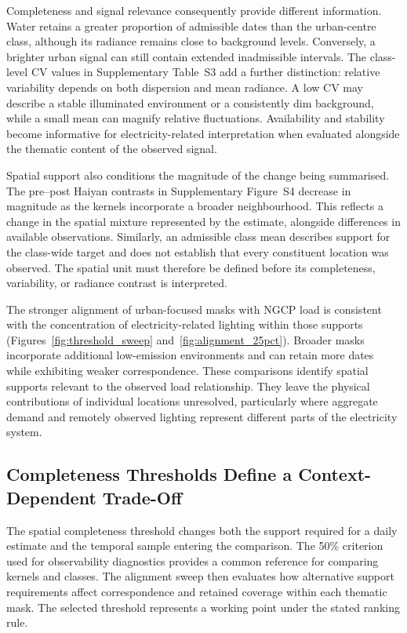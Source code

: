 \documentclass[]{interact}
\theoremstyle{plain}%
\theoremstyle{definition}
\theoremstyle{remark}
\begin{document}
        Completeness and signal relevance consequently provide different information. Water retains a greater proportion of admissible dates than the urban-centre class, although its radiance remains close to background levels. Conversely, a brighter urban signal can still contain extended inadmissible intervals. The class-level CV values in Supplementary Table~S3 add a further distinction: relative variability depends on both dispersion and mean radiance. A low CV may describe a stable illuminated environment or a consistently dim background, while a small mean can magnify relative fluctuations. Availability and stability become informative for electricity-related interpretation when evaluated alongside the thematic content of the observed signal.
        
        Spatial support also conditions the magnitude of the change being summarised. The pre--post Haiyan contrasts in Supplementary Figure~S4 decrease in magnitude as the kernels incorporate a broader neighbourhood. This reflects a change in the spatial mixture represented by the estimate, alongside differences in available observations. Similarly, an admissible class mean describes support for the class-wide target and does not establish that every constituent location was observed. The spatial unit must therefore be defined before its completeness, variability, or radiance contrast is interpreted.
        
        The stronger alignment of urban-focused masks with NGCP load is consistent with the concentration of electricity-related lighting within those supports (Figures~\ref{fig:threshold_sweep} and~\ref{fig:alignment_25pct}). Broader masks incorporate additional low-emission environments and can retain more dates while exhibiting weaker correspondence. These comparisons identify spatial supports relevant to the observed load relationship. They leave the physical contributions of individual locations unresolved, particularly where aggregate demand and remotely observed lighting represent different parts of the electricity system.
    
    \subsection{Completeness Thresholds Define a Context-Dependent Trade-Off}
    
        The spatial completeness threshold changes both the support required for a daily estimate and the temporal sample entering the comparison. The 50\% criterion used for observability diagnostics provides a common reference for comparing kernels and classes. The alignment sweep then evaluates how alternative support requirements affect correspondence and retained coverage within each thematic mask. The selected threshold represents a working point under the stated ranking rule.
        
\end{document}
